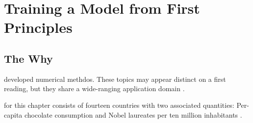 \chapter{Training a Model from First Principles}







\section{The Why}


 developed numerical methdos.
These topics may appear distinct on a first reading,
but they share a wide-ranging application domain \cite{karpathy2019recipe}.



 for this chapter consists of fourteen countries with two associated quantities:
Per-capita chocolate consumption and Nobel laureates per ten million inhabitants \cite{messerlichocolate}.



